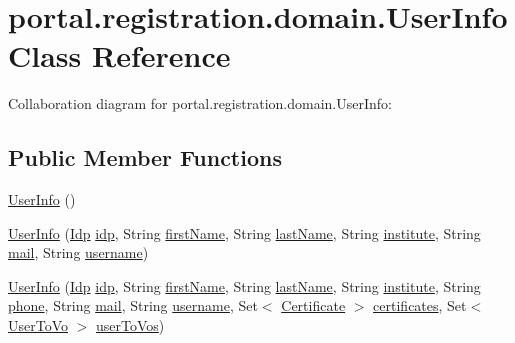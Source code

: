 \hypertarget{classportal_1_1registration_1_1domain_1_1UserInfo}{
\section{portal.registration.domain.UserInfo Class Reference}
\label{classportal_1_1registration_1_1domain_1_1UserInfo}
}


Collaboration diagram for portal.registration.domain.UserInfo:
\subsection*{Public Member Functions}
\begin{DoxyCompactItemize}
\item 
\hyperlink{classportal_1_1registration_1_1domain_1_1UserInfo_a6c17329b45a9e55c087de4b7d21cfa0a}{UserInfo} ()
\item 
\hyperlink{classportal_1_1registration_1_1domain_1_1UserInfo_a881fb81e3217c91595c867a7b079df84}{UserInfo} (\hyperlink{classportal_1_1registration_1_1domain_1_1Idp}{Idp} \hyperlink{classportal_1_1registration_1_1domain_1_1UserInfo_a9ee2008ca7555a9237135aedd8d0949b}{idp}, String \hyperlink{classportal_1_1registration_1_1domain_1_1UserInfo_a40352804afaf61b92208e4835ca8e5af}{firstName}, String \hyperlink{classportal_1_1registration_1_1domain_1_1UserInfo_a294fb84a68dad74ae5ed4e2186f5e460}{lastName}, String \hyperlink{classportal_1_1registration_1_1domain_1_1UserInfo_a71b2ba532eff8a9fb4fac4c000b3a8f3}{institute}, String \hyperlink{classportal_1_1registration_1_1domain_1_1UserInfo_a0433a86cea33aac5e724356012617157}{mail}, String \hyperlink{classportal_1_1registration_1_1domain_1_1UserInfo_ac3583a042c907bcce6ee84d3b2ee637d}{username})
\item 
\hyperlink{classportal_1_1registration_1_1domain_1_1UserInfo_afc3d148d311ec9d48e33933668177cc0}{UserInfo} (\hyperlink{classportal_1_1registration_1_1domain_1_1Idp}{Idp} \hyperlink{classportal_1_1registration_1_1domain_1_1UserInfo_a9ee2008ca7555a9237135aedd8d0949b}{idp}, String \hyperlink{classportal_1_1registration_1_1domain_1_1UserInfo_a40352804afaf61b92208e4835ca8e5af}{firstName}, String \hyperlink{classportal_1_1registration_1_1domain_1_1UserInfo_a294fb84a68dad74ae5ed4e2186f5e460}{lastName}, String \hyperlink{classportal_1_1registration_1_1domain_1_1UserInfo_a71b2ba532eff8a9fb4fac4c000b3a8f3}{institute}, String \hyperlink{classportal_1_1registration_1_1domain_1_1UserInfo_af6775663ccce32e01fc070f1342f523f}{phone}, String \hyperlink{classportal_1_1registration_1_1domain_1_1UserInfo_a0433a86cea33aac5e724356012617157}{mail}, String \hyperlink{classportal_1_1registration_1_1domain_1_1UserInfo_ac3583a042c907bcce6ee84d3b2ee637d}{username}, Set$<$ \hyperlink{classportal_1_1registration_1_1domain_1_1Certificate}{Certificate} $>$ \hyperlink{classportal_1_1registration_1_1domain_1_1UserInfo_a5923ed9351bde36f580647933f7b3fe0}{certificates}, Set$<$ \hyperlink{classportal_1_1registration_1_1domain_1_1UserToVo}{UserToVo} $>$ \hyperlink{classportal_1_1registration_1_1domain_1_1UserInfo_a334522ed169ed1e54ac676a31b0cc701}{userToVos})

\end{DoxyCompactItemize}
